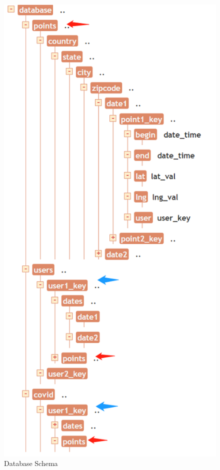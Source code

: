 \documentclass{ucsdreport}
\begin{document}
\begin{figure}[H]
    \includegraphics[scale=0.5]{images/database2.png}
    \caption{Database Schema}
\end{figure}
\end{document}
